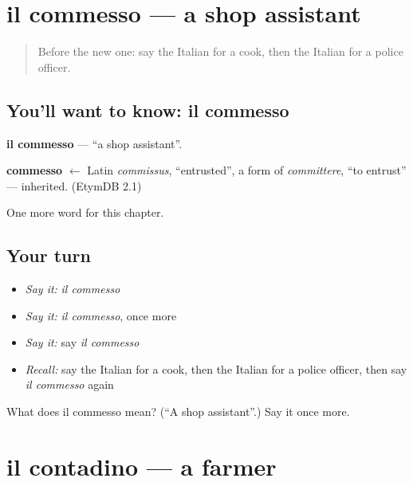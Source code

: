 \section[il commesso]{il commesso — a shop assistant}

\label{lesson:IT-C111-commesso}



\begin{quote}
Before the new one: say the Italian for a cook, then the Italian for a police officer.
\end{quote}

\subsection*{You'll want to know: il commesso}
\textbf{il commesso} — \textquotedblleft{}a shop assistant\textquotedblright{}.

\begin{cousinweb}
\textbf{commesso} $\leftarrow$ Latin \emph{commissus}, \textquotedblleft{}entrusted\textquotedblright{}, a form of \emph{committere}, \textquotedblleft{}to entrust\textquotedblright{} — inherited. (EtymDB 2.1)
\end{cousinweb}

\begin{grammarlens}[title={What you've built}]
One more word for this chapter.
\end{grammarlens}

\subsection*{Your turn}
\begin{itemize}
\raggedright
  \item \emph{Say it:} \emph{il commesso}
  \item \emph{Say it:} \emph{il commesso}, once more
  \item \emph{Say it:} say \emph{il commesso}
  \item \emph{Recall:} say the Italian for a cook, then the Italian for a police officer, then say \emph{il commesso} again
\end{itemize}

\begin{tcolorbox}[breakable,colback=teal!4,colframe=teal!35!black,title={Before you move on}]
What does il commesso mean? (\textquotedblleft{}A shop assistant\textquotedblright{}.) Say it once more.
\end{tcolorbox}
\section[il contadino]{il contadino — a farmer}

